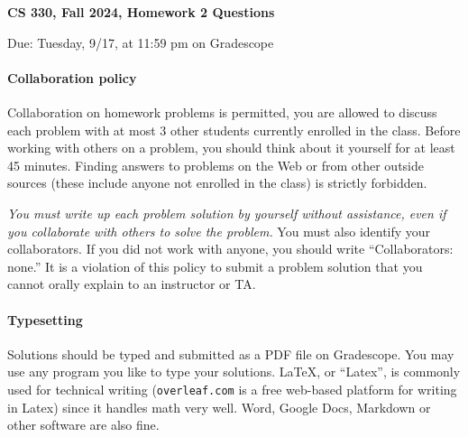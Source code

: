 \documentclass[11pt]{article}
\begin{document}
	
\begin{center}
\Large{\textbf{CS 330, Fall 2024, Homework 2 Questions \\}}
\end{center}

\begin{center}
Due: Tuesday, 9/17, at 11:59 pm on Gradescope
\end{center}


\paragraph{Collaboration policy} Collaboration on homework problems is permitted,  you are allowed to discuss
each problem with at most 3 other students currently enrolled in the
class.
Before working with others on a problem, you should think about it
yourself for at least 45 minutes. Finding answers to problems on the
Web or from other outside sources (these include anyone not enrolled
in the class) is strictly forbidden.

{\em You must write up each problem solution by yourself without
	assistance, even if you collaborate with others to solve the
	problem.} You must also identify your collaborators. If you did not
work with anyone, you should write ``Collaborators: none.'' It is a
violation of this policy to submit a problem solution that you
cannot orally explain to an instructor or TA.

\paragraph{Typesetting} Solutions should be typed and submitted as a
PDF file on Gradescope. You may use any program you like to type your
solutions. \LaTeX, or ``Latex'', is commonly used for technical writing (\texttt{overleaf.com}
is a free web-based platform for writing in Latex) since it handles
math very well. Word, Google
Docs, Markdown or other software are also fine. 
\end{document}

